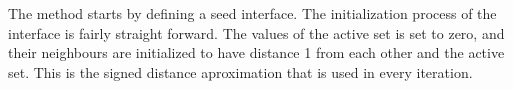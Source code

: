 The method starts by defining a seed interface. The initialization process of the interface is fairly straight forward. The values of the active set is set to zero, and their neighbours are initialized to have distance 1 from each other and the active set. This is the signed distance aproximation that is used in  every iteration. 









